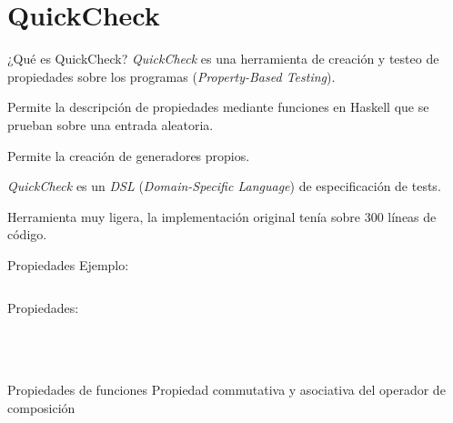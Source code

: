 \documentclass[10pt]{beamer}
\newcommand\Fontvi{\fontsize{10}{12}\selectfont}
\begin{document}
\section{QuickCheck}

\begin{frame}{¿Qué es QuickCheck?}
  \textit{QuickCheck} es una herramienta de creación y testeo de
  propiedades sobre los programas (\textit{Property-Based Testing}).

  Permite la descripción de propiedades mediante funciones en Haskell
  que se prueban sobre una entrada aleatoria.

  Permite la creación de generadores propios.

  \textit{QuickCheck} es un \textit{DSL} (\textit{Domain-Specific
    Language}) de especificación de tests.

  Herramienta muy ligera, la implementación original tenía sobre 300
  líneas de código.
\end{frame}

\begin{frame}{Propiedades}
  Ejemplo:
  \inputminted{text}{data/reverse.hs}
  Propiedades:
  \inputminted{haskell}{data/reverse_prop.hs}
\end{frame}


\begin{frame}[standout]
  \Fontvi
  \inputminted{text}{data/pruebas_rev.txt}
\end{frame}


\begin{frame}[standout]
  \Fontvi
  \inputminted{text}{data/reverse_prop_pruebas_verb.txt}
\end{frame}

\begin{frame}[standout]
  \Fontvi
  \inputminted{text}{data/reverse_prop_pruebas_verb1.txt}
\end{frame}

\begin{frame}{Propiedades de funciones}
  Propiedad commutativa y asociativa del operador de composición
  \inputminted{haskell}{data/func_prop.hs}
\end{frame}

\begin{frame}[standout]
  \Fontvi
  \inputminted{text}{data/pruebas_func.txt}
\end{frame}
\end{document}
